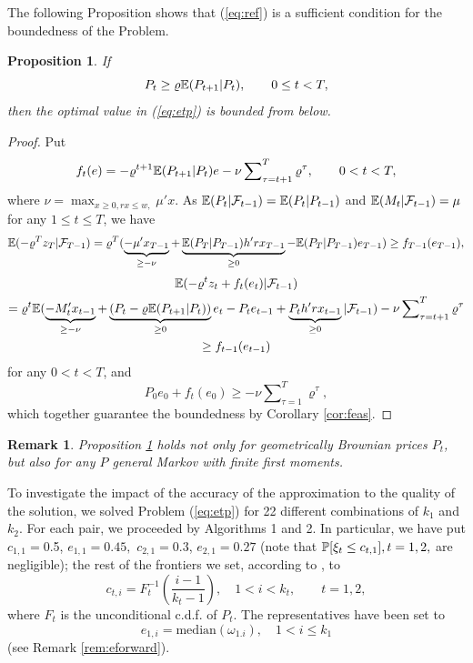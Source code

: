 \documentclass{article}              %
\newtheorem{proposition}{Proposition}
\newtheorem{remark}{Remark}
\begin{document}
The following Proposition shows that (\ref{eq:ref}) is a sufficient
condition for the boundedness of the Problem.
\begin{proposition}
\label{prop:pprop}If 
\begin{equation}
P_{t}\geq\varrho\E(P_{t+1}|P_{t}),\qquad0\leq t<T,\label{eq:eb}
\end{equation}
then the optimal value in (\ref{eq:etp}) is bounded from below.
\end{proposition}

\begin{proof}
Put 
\[
f_{t}(e)=-\varrho^{t+1}\E(P_{t+1}|P_{t})e-\nu\sum\nolimits_{\tau=t+1}^{T} \varrho^\tau ,\qquad0<t<T,
\]
where $\nu=\max_{x\geq0,rx\leq w,}\mu'x$. As $\E(P_t|\F_{t-1})=\E(P_t|P_{t-1})$ and 
$\E(M_t|\F_{t-1})=\mu$ for any $1\leq t \leq T$, we have
$$
\E(-\varrho^{T}z_{T}|\F_{T-1})
=\varrho^{T}(\underbrace{-\mu'x_{T-1}}_{\geq -\nu}+\underbrace{\E(P_{T}|P_{T-1})h'rx_{T-1}}_{\geq 0}-\E(P_{T}|P_{T-1})e_{T-1})
\geq
f_{T-1}(e_{T-1}),
$$
\begin{multline*}
\E(-\varrho^{t}z_{t}+f_{t}(e_{t})|\F_{t-1})\\
=\varrho^{t}\E(\underbrace{-M'_{t}x_{t-1}}_{\geq -\nu}+\underbrace{(P_{t}-\varrho\E(P_{t+1}|P_{t}))}_{\geq 0}e_t-P_te_{t-1}+\underbrace{P_th'rx_{t-1}}_{\geq 0}
|\F_{t-1})-\nu\sum\nolimits_{\tau=t+1}^{T} \varrho^\tau\\
\geq
f_{t-1}(e_{t-1})
\end{multline*}
for any $0<t<T$, and
\[
P_{0}e_{0}+f_{t}(e_0)
\geq
-\nu\sum\nolimits_{\tau=1}^{T} \varrho^\tau,
\]
which together guarantee the boundedness by Corollary \ref{cor:feas}.
\end{proof}
\begin{remark}
Proposition \ref{prop:pprop} holds not only for geometrically
Brownian prices $P_t$, but also for any $P$ general Markov with finite first
moments.
\end{remark}

\noindent To investigate the impact of the accuracy of the approximation to
the quality of the solution, we solved Problem (\ref{eq:etp}) for 22 different combinations of 
$k_{1}$ and $k_{2}$. For each pair, we proceeded
by Algorithms 1 and 2. In particular, we have put $c_{1,1}=$0.5, $e_{1,1}=0.45,$
$c_{2,1}=0.3$, $e_{2,1}=0.27$ (note that $\P[\xi_{t}\leq c_{t,1}],t=1,2,$
are negligible); the rest of the frontiers we set, according to \cite{Smid09c}, to
\[
c_{t,i}=F_{t}^{-1}\left(\frac{i-1}{k_{t}-1}\right),\quad1<i<k_{t},\qquad t=1,2,
\]
where $F_{t}$ is the unconditional c.d.f. of $P_{t}$. The representatives have been set to 
$$
e_{1,i}=\mathrm{median}(\omega_{1.i}),\quad1<i\leq k_{1}
$$
(see Remark \ref{rem:eforward}).
\end{document}
